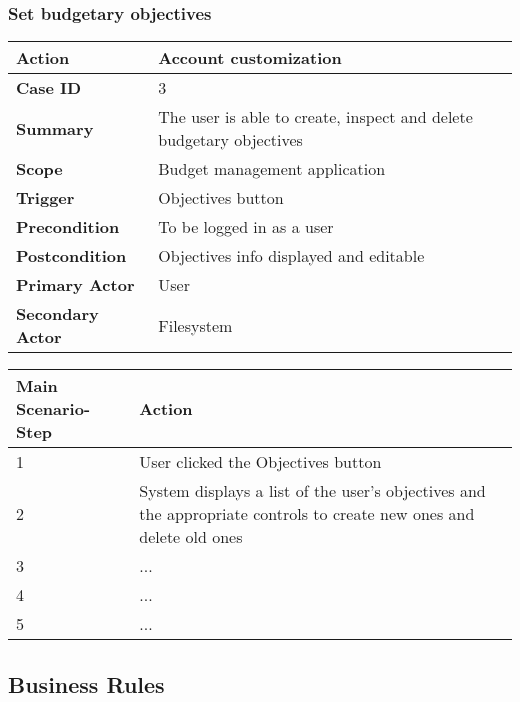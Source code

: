 \documentclass[letterpaper]{article}
\begin{document}
		\subsubsection{Set budgetary objectives}
		
		\begin{center}
			\begin{tabular}{ | m{5cm} | m{10cm}| } 
				\hline
				\textbf{Action} & Account customization \\ 
				\hline
				\textbf{Case ID} & 3 \\ 
				\hline
				\textbf{Summary} & The user is able to create, inspect and delete budgetary objectives \\
				\hline
				\textbf{Scope} & Budget management application \\ 
				\hline
				\textbf{Trigger} & Objectives button \\
				\hline
				\textbf{Precondition} & To be logged in as a user \\ 
				\hline
				\textbf{Postcondition} & Objectives info displayed and editable \\ 
				\hline
				\textbf{Primary Actor} & User \\ 
				\hline
				\textbf{Secondary Actor} & Filesystem \\ 
				\hline
			\end{tabular}
		
			\vspace{2mm}
		
			\begin{tabular}{ | m{5cm} | m{10cm}| } 
				\hline
				\textbf{Main Scenario-Step} & \textbf{Action} \\ 
				\hline
				1 & User clicked the Objectives button \\ 
				\hline
				2 & System displays a list of the user's objectives and the appropriate controls to create new ones and delete old ones \\ 
				\hline
				3 & ... \\ 
				\hline
				4 & ... \\ 
				\hline
				5 & ... \\ 
				\hline
			\end{tabular}
		\end{center}
	
	\subsection{Business Rules}
	
\end{document}
